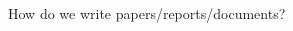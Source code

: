 \documentclass[
  ignorenonframetext,
  aspectratio=169,
]{beamer}
\begin{document}
\begin{frame}{How do we write papers/reports/documents?}
\protect\hypertarget{how-do-we-write-papersreportsdocuments}{}
\newcommand{\todonow}{\textcolor{Plum}{TO-DO}}
\newcommand{\todolater}{\textcolor{Orange}{TO-DO}}
\newcommand{\good}{\textcolor{OliveGreen}{$\checkmark$}}
\newcommand{\bad}{\textcolor{red}{$\times$}}
\newcommand{\neutral}{\textcolor{DarkBlue}{$\sim$}}

\begin{columns}[T]
\begin{column}{0.25\textwidth}
\centering {}
\end{column}

\begin{column}{0.25\textwidth}
\centering {}
\end{column}

\begin{column}{0.25\textwidth}
\centering {}
\end{column}

\begin{column}{0.25\textwidth}
\centering {}
\end{column}
\end{columns}



\end{frame}
\end{document}
